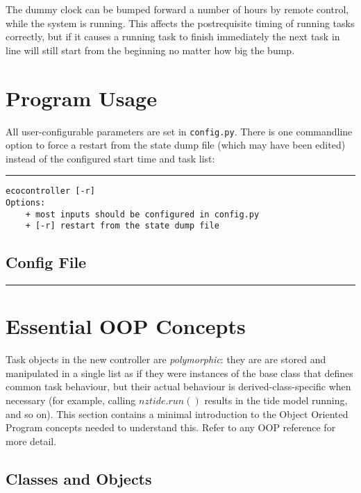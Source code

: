 \documentclass[11pt,a4paper]{article}
\begin{document}
The dummy clock can be bumped forward a number of hours by remote
control, while the system is running. This affects the postrequisite
timing of running tasks correctly, but if it causes a running task to
finish immediately the next task in line will still start from the
beginning no matter how big the bump.


\section{Program Usage}

All user-configurable parameters are set in \verb#config.py#. There is
one commandline option to force a restart from the state dump file
(which may have been edited) instead of the configured start time and
task list:

\lstset{language=sh}

{\small

\noindent
\rule{5cm}{.2mm}
\begin{lstlisting}
ecocontroller [-r]
Options:
    + most inputs should be configured in config.py
    + [-r] restart from the state dump file
\end{lstlisting}
}

\lstset{language=Python}

\subsection{Config File}

{\small
\noindent
\rule{5cm}{.2mm}

}

\appendix

\section{Essential OOP Concepts}

Task objects in the new controller are {\em polymorphic}: they are are
stored and manipulated in a single list as if they were instances of the
base class that defines common task behaviour, but their actual
behaviour is derived-class-specific when necessary (for example, calling
$nztide.run()$ results in the tide model running, and so on). This
section contains a minimal introduction to the Object Oriented Program
concepts needed to understand this.  Refer to any OOP reference for more
detail.

\subsection{Classes and Objects}
\end{document}
